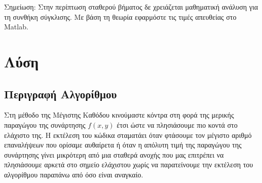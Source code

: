 \documentclass{report}
\begin{document}
Σημείωση: Στην περίπτωση σταθερού βήματος δε χρειάζεται μαθηματική ανάλυση για τη συνθήκη σύγκλισης. 
Με βάση τη θεωρία εφαρμόστε τις τιμές απευθείας στο Matlab.
\section{Λύση}
\subsection{Περιγραφή Αλγορίθμου}
Στη μέθοδο της Μέγιστης Καθόδου κινούμαστε κόντρα στη φορά της μερικής παραγώγου της συνάρτησης
$f(x,y)$ έτσι ώστε να πλησιάσουμε πιο κοντά στο ελάχιστο της. Η εκτέλεση του κώδικα σταματάει 
όταν φτάσουμε τον μέγιστο αριθμό επαναλήψεων που ορίσαμε αυθαίρετα ή όταν η απόλυτη τιμή της 
παραγώγου της συνάρτησης γίνει μικρότερη από μια σταθερά ανοχής που μας επιτρέπει να πλησιάσουμε 
αρκετά στο σημείο ελάχιστου χωρίς να παρατείνουμε την εκτέλεση του αλγορίθμου παραπάνω από όσο
είναι αναγκαίο.
\end{document}
